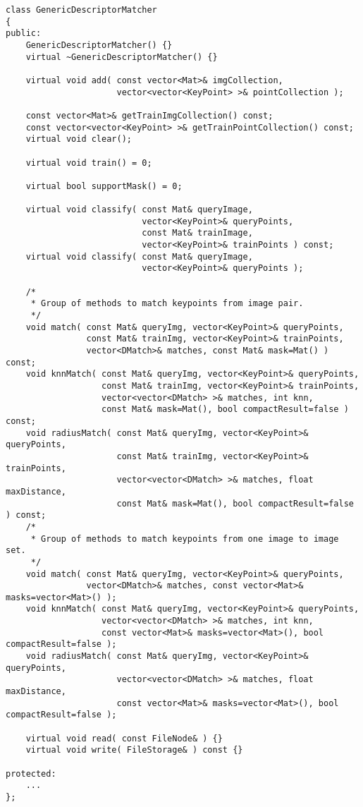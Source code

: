 \begin{lstlisting}
class GenericDescriptorMatcher
{
public:
    GenericDescriptorMatcher() {}
    virtual ~GenericDescriptorMatcher() {}

    virtual void add( const vector<Mat>& imgCollection,
                      vector<vector<KeyPoint> >& pointCollection );

    const vector<Mat>& getTrainImgCollection() const;
    const vector<vector<KeyPoint> >& getTrainPointCollection() const;
	virtual void clear();

    virtual void train() = 0;

	virtual bool supportMask() = 0;

    virtual void classify( const Mat& queryImage, 
                           vector<KeyPoint>& queryPoints,
                           const Mat& trainImage, 
                           vector<KeyPoint>& trainPoints ) const;
    virtual void classify( const Mat& queryImage, 
                           vector<KeyPoint>& queryPoints );

    /*
     * Group of methods to match keypoints from image pair.
     */
    void match( const Mat& queryImg, vector<KeyPoint>& queryPoints,
                const Mat& trainImg, vector<KeyPoint>& trainPoints,
                vector<DMatch>& matches, const Mat& mask=Mat() ) const;
    void knnMatch( const Mat& queryImg, vector<KeyPoint>& queryPoints,
                   const Mat& trainImg, vector<KeyPoint>& trainPoints,
                   vector<vector<DMatch> >& matches, int knn, 
                   const Mat& mask=Mat(), bool compactResult=false ) const;
    void radiusMatch( const Mat& queryImg, vector<KeyPoint>& queryPoints,
                      const Mat& trainImg, vector<KeyPoint>& trainPoints,
                      vector<vector<DMatch> >& matches, float maxDistance, 
                      const Mat& mask=Mat(), bool compactResult=false ) const;
    /*
     * Group of methods to match keypoints from one image to image set.
     */
    void match( const Mat& queryImg, vector<KeyPoint>& queryPoints,
                vector<DMatch>& matches, const vector<Mat>& masks=vector<Mat>() );
    void knnMatch( const Mat& queryImg, vector<KeyPoint>& queryPoints,
                   vector<vector<DMatch> >& matches, int knn, 
                   const vector<Mat>& masks=vector<Mat>(), bool compactResult=false );
    void radiusMatch( const Mat& queryImg, vector<KeyPoint>& queryPoints,
                      vector<vector<DMatch> >& matches, float maxDistance, 
                      const vector<Mat>& masks=vector<Mat>(), bool compactResult=false );

    virtual void read( const FileNode& ) {}
    virtual void write( FileStorage& ) const {}

protected:
    ...
};
\end{lstlisting}

